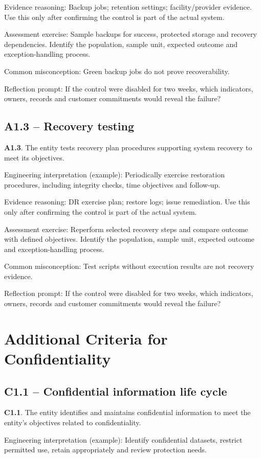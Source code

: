 \documentclass[10pt,oneside]{report}
\begin{document}
Evidence reasoning: Backup jobs; retention settings; facility/provider evidence. Use this only after confirming the control is part of the actual system.

Assessment exercise: Sample backups for success, protected storage and recovery dependencies. Identify the population, sample unit, expected outcome and exception-handling process.

Common misconception: Green backup jobs do not prove recoverability.

Reflection prompt: If the control were disabled for two weeks, which indicators, owners, records and customer commitments would reveal the failure?

\subsection{A1.3 -- Recovery testing}
\begin{aicpabox}
\textbf{A1.3}. The entity tests recovery plan procedures supporting system recovery to meet its objectives.\par{}
\end{aicpabox}
Engineering interpretation (example): Periodically exercise restoration procedures, including integrity checks, time objectives and follow-up.

Evidence reasoning: DR exercise plan; restore logs; issue remediation. Use this only after confirming the control is part of the actual system.

Assessment exercise: Reperform selected recovery steps and compare outcome with defined objectives. Identify the population, sample unit, expected outcome and exception-handling process.

Common misconception: Test scripts without execution results are not recovery evidence.

Reflection prompt: If the control were disabled for two weeks, which indicators, owners, records and customer commitments would reveal the failure?

\section{Additional Criteria for Confidentiality}
\subsection{C1.1 -- Confidential information life cycle}
\begin{aicpabox}
\textbf{C1.1}. The entity identifies and maintains confidential information to meet the entity's objectives related to confidentiality.\par{}
\end{aicpabox}
Engineering interpretation (example): Identify confidential datasets, restrict permitted use, retain appropriately and review protection needs.
\end{document}
